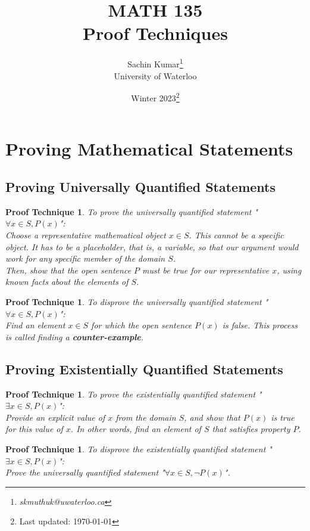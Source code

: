 \documentclass[10pt]{article}
\theoremstyle{break}
\newtheorem{pt}[thm]{Proof Technique}
\newcommand{\subject}{MATH 135 \\ Proof Techniques}
\newcommand{\semester}{Winter 2023}
\begin{document}
\let\ref\Cref

\title{\subject}
\author{Sachin Kumar\thanks{\itshape skmuthuk@uwaterloo.ca}\\ University of Waterloo}
\date{\semester\thanks{Last updated: \today}}

\maketitle
\newpage
\tableofcontents
\newpage







\section{Proving Mathematical Statements}
\subsection{Proving Universally Quantified Statements}
\begin{pt}
    To prove the universally quantified statement "$\forall x \in S, P(x)$": 
    \vspace{0.5ex} \\ 
    Choose a representative mathematical object $x \in S$. This cannot be a specific object. 
    It has to be a placeholder, that is, a variable, so that our argument would work for any 
    specific member of the domain $S$.\\
    Then, show that the open sentence $P$ must be true for our representative $x$, using known 
    facts about the elements of $S$.
\end{pt}
\begin{pt}
    To disprove the universally quantified statement "$\forall x \in S, P(x)$": \\
    Find an element $x \in S$ for which the open sentence $P(x)$ is false. This process is called finding a \emph{\textbf{counter-example}}.
\end{pt}

\subsection{Proving Existentially Quantified Statements}
\begin{pt}
    To prove the existentially quantified statement "$\exists x \in S, P(x)$": \\
    Provide an explicit value of $x$ from the domain $S$, and show that $P(x)$
    is true for this value of $x$. In other words, find an element of $S$ that 
    satisfies property $P$.
\end{pt}
\begin{pt}
    To disprove the existentially quantified statement "$\exists x \in S, P(x)$": \\
    Prove the universally quantified statement "$\forall x \in S, \neg P(x)$".
\end{pt}
\end{document}
